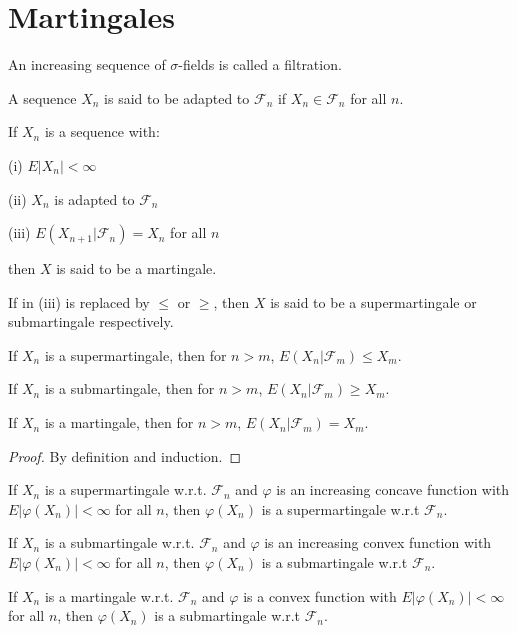 \section{Martingales}
\begin{definition}[filtration]
An increasing sequence of $\sigma$-fields is called a filtration.
\end{definition}
\begin{definition}[adapted]
A sequence $X_n$ is said to be adapted to $\mathcal{F}_n$ if $X_n\in\mathcal{F}_n$ for all $n$.
\end{definition}
\begin{definition}[martingale]
If $X_n$ is a sequence with:\par
(i) $E\left|X_n\right|<\infty$\par
(ii) $X_n$ is adapted to $\mathcal{F}_n$\par
(iii) $E(X_{n+1}|\mathcal{F}_n)=X_n$ for all $n$\par
then $X$ is said to be a martingale.
\end{definition}
\begin{remark}
If in (iii) is replaced by $\le$ or $\ge$, then $X$ is said to be a supermartingale or submartingale respectively.
\end{remark}
\begin{theorem}
If $X_n$ is a supermartingale, then for $n>m$, $E(X_n|\mathcal{F}_m)\le X_m$.\par
If $X_n$ is a submartingale, then for $n>m$, $E(X_n|\mathcal{F}_m)\ge X_m$.\par
If $X_n$ is a martingale, then for $n>m$, $E(X_n|\mathcal{F}_m)= X_m$.
\end{theorem}
\begin{proof}
By definition and induction.
\end{proof}
\begin{theorem}
If $X_n$ is a supermartingale w.r.t. $\mathcal{F}_n$ and $\varphi$ is an increasing  concave function with $E\left|\varphi(X_n)\right|<\infty$ for all $n$, then $\varphi(X_n)$ is a supermartingale w.r.t $\mathcal{F}_n$. \par
If $X_n$ is a submartingale w.r.t. $\mathcal{F}_n$ and $\varphi$ is an increasing  convex function with $E\left|\varphi(X_n)\right|<\infty$ for all $n$, then $\varphi(X_n)$ is a submartingale w.r.t $\mathcal{F}_n$. \par
If $X_n$ is a martingale w.r.t. $\mathcal{F}_n$ and $\varphi$ is a convex function with $E\left|\varphi(X_n)\right|<\infty$ for all $n$, then $\varphi(X_n)$ is a submartingale w.r.t $\mathcal{F}_n$. 
\end{theorem}
